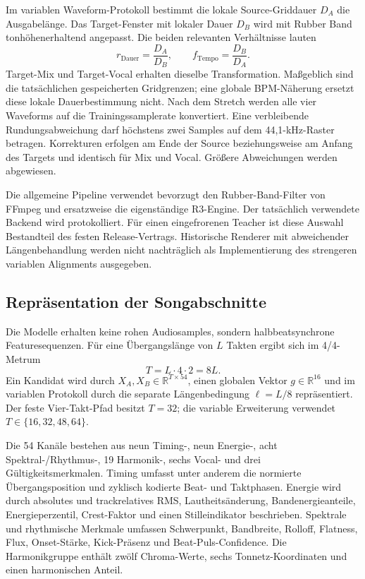Im variablen Waveform-Protokoll bestimmt die lokale Source-Griddauer $D_A$ die Ausgabelänge. Das Target-Fenster mit lokaler Dauer $D_B$ wird mit Rubber Band tonhöhenerhaltend angepasst. Die beiden relevanten Verhältnisse lauten
\begin{equation}
  r_{\mathrm{Dauer}}=\frac{D_A}{D_B},
  \qquad f_{\mathrm{Tempo}}=\frac{D_B}{D_A}.
\end{equation}
Target-Mix und Target-Vocal erhalten dieselbe Transformation. Maßgeblich sind die tatsächlichen gespeicherten Gridgrenzen; eine globale BPM-Näherung ersetzt diese lokale Dauerbestimmung nicht. Nach dem Stretch werden alle vier Waveforms auf die Trainingssamplerate konvertiert. Eine verbleibende Rundungsabweichung darf höchstens zwei Samples auf dem 44,1-kHz-Raster betragen. Korrekturen erfolgen am Ende der Source beziehungsweise am Anfang des Targets und identisch für Mix und Vocal. Größere Abweichungen werden abgewiesen.

Die allgemeine Pipeline verwendet bevorzugt den Rubber-Band-Filter von FFmpeg und ersatzweise die eigenständige R3-Engine. Der tatsächlich verwendete Backend wird protokolliert. Für einen eingefrorenen Teacher ist diese Auswahl Bestandteil des festen Release-Vertrags. Historische Renderer mit abweichender Längenbehandlung werden nicht nachträglich als Implementierung des strengeren variablen Alignments ausgegeben.

\subsection{Repräsentation der Songabschnitte}
\label{sec:methodik-features}

Die Modelle erhalten keine rohen Audiosamples, sondern halbbeatsynchrone Featuresequenzen. Für eine Übergangslänge von $L$ Takten ergibt sich im 4/4-Metrum
\begin{equation}
 T = L\cdot4\cdot2=8L.
\end{equation}
Ein Kandidat wird durch $X_A,X_B\in\mathbb{R}^{T\times54}$, einen globalen Vektor $g\in\mathbb{R}^{16}$ und im variablen Protokoll durch die separate Längenbedingung $\ell=L/8$ repräsentiert. Der feste Vier-Takt-Pfad besitzt $T=32$; die variable Erweiterung verwendet $T\in\{16,32,48,64\}$.

Die 54 Kanäle bestehen aus neun Timing-, neun Energie-, acht Spektral-/Rhythmus-, 19 Harmonik-, sechs Vocal- und drei Gültigkeitsmerkmalen. Timing umfasst unter anderem die normierte Übergangsposition und zyklisch kodierte Beat- und Taktphasen. Energie wird durch absolutes und trackrelatives RMS, Lautheitsänderung, Bandenergieanteile, Energieperzentil, Crest-Faktor und einen Stilleindikator beschrieben. Spektrale und rhythmische Merkmale umfassen Schwerpunkt, Bandbreite, Rolloff, Flatness, Flux, Onset-Stärke, Kick-Präsenz und Beat-Puls-Confidence. Die Harmonikgruppe enthält zwölf Chroma-Werte, sechs Tonnetz-Koordinaten und einen harmonischen Anteil.

